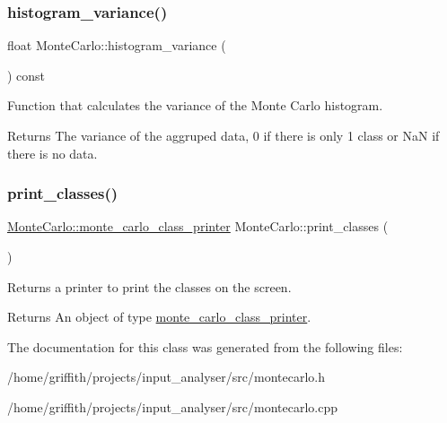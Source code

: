 \subsubsection{\texorpdfstring{histogram\+\_\+variance()}{histogram\_variance()}}
{\footnotesize\ttfamily float Monte\+Carlo\+::histogram\+\_\+variance (\begin{DoxyParamCaption}{ }\end{DoxyParamCaption}) const}

Function that calculates the variance of the Monte Carlo histogram. \begin{DoxyReturn}{Returns}
The variance of the aggruped data, 0 if there is only 1 class or NaN if there is no data. 
\end{DoxyReturn}
\mbox{\label{classMonteCarlo_a736ca6442900d47116bc040c284ac69f}} 
\subsubsection{\texorpdfstring{print\+\_\+classes()}{print\_classes()}}
{\footnotesize\ttfamily \hyperlink{structMonteCarlo_1_1monte__carlo__class__printer}{Monte\+Carlo\+::monte\+\_\+carlo\+\_\+class\+\_\+printer} Monte\+Carlo\+::print\+\_\+classes (\begin{DoxyParamCaption}{ }\end{DoxyParamCaption})}

Returns a printer to print the classes on the screen. \begin{DoxyReturn}{Returns}
An object of type \hyperlink{structMonteCarlo_1_1monte__carlo__class__printer}{monte\+\_\+carlo\+\_\+class\+\_\+printer}. 
\end{DoxyReturn}


The documentation for this class was generated from the following files\+:\begin{DoxyCompactItemize}
\item 
/home/griffith/projects/input\+\_\+analyser/src/montecarlo.\+h\item 
/home/griffith/projects/input\+\_\+analyser/src/montecarlo.\+cpp\end{DoxyCompactItemize}
